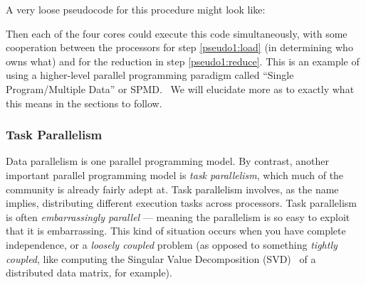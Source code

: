 A very loose pseudocode for this procedure might look like:


Then each of the four cores could execute this code simultaneously, with some cooperation between the processors for step \ref{pseudo1:load} (in determining who owns what) and for the reduction in step \ref{pseudo1:reduce}.  This is an example of using a higher-level parallel programming paradigm called ``Single Program/Multiple Data'' or SPMD.~  We will elucidate more as to exactly what this means in the sections to follow.



\subsubsection{Task Parallelism}

Data parallelism is one parallel programming model.  By contrast, another important parallel programming model is \emph{task parallelism}, which much of the  community is already fairly adept at.  Task parallelism involves, as the name implies, distributing different execution tasks across processors.  Task parallelism is often \emph{embarrassingly parallel} --- meaning the parallelism is so easy to exploit that it is embarrassing.  This kind of situation occurs when you have complete independence, or a \emph{loosely coupled} problem (as opposed to something \emph{tightly coupled}, like computing the Singular Value Decomposition (SVD)~ of a distributed data matrix, for example).  

